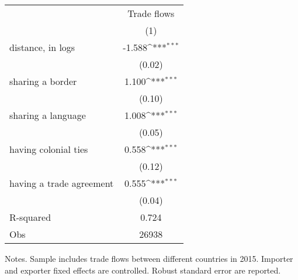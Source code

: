 \def\sym#1{\ifmmode^{#1}\else\(^{#1}\)\fi}
\begin{tabular}{lc}
\toprule
\toprule
& \multicolumn{1}{c}{Trade flows} \\ 
                    &\multicolumn{1}{c}{(1)}         \\
\hline
distance, in logs   &      -1.588\sym{***}\\
                    &      (0.02)         \\
[1em]
sharing a border    &       1.100\sym{***}\\
                    &      (0.10)         \\
[1em]
sharing a language  &       1.008\sym{***}\\
                    &      (0.05)         \\
[1em]
having colonial ties&       0.558\sym{***}\\
                    &      (0.12)         \\
[1em]
having a trade agreement&       0.555\sym{***}\\
                    &      (0.04)         \\
\hline
R-squared           &       0.724         \\
Obs                 &       26938         \\
\hline
\hline
\end{tabular}
\begin{tablenotes}
\footnotesize
\item
Notes. Sample includes trade flows between different countries in 2015. Importer and exporter fixed effects are controlled. Robust standard error are reported. 
\end{tablenotes}
